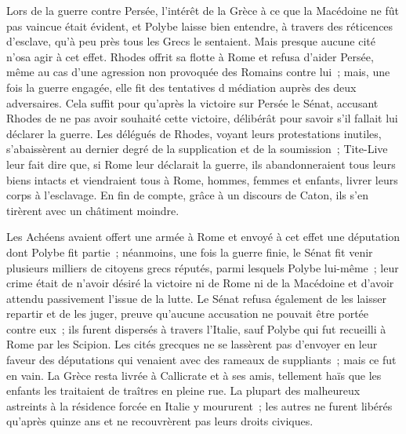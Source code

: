 \documentclass[french,twoside]{book} %
\begin{document}
Lors de la guerre contre Persée, l'intérêt de la Grèce à ce que la Macédoine ne fût pas vaincue était évident, et Polybe laisse bien entendre, à travers des réticences d'esclave, qu'à peu près tous les Grecs le sentaient. Mais presque aucune cité n'osa agir à cet effet. Rhodes offrit sa flotte à Rome et refusa d'aider Persée, même au cas d'une agression non provoquée des Romains contre lui ; mais, une fois la guerre engagée, elle fit des tentatives d médiation auprès des deux adversaires. Cela suffit pour qu'après la victoire sur Persée le Sénat, accusant Rhodes de ne pas avoir souhaité cette victoire, délibérât pour savoir s'il fallait lui déclarer la guerre. Les délégués de Rhodes, voyant leurs protestations inutiles, s'abaissèrent au dernier degré de la supplication et de la soumission ; Tite-Live leur fait dire que, si Rome leur déclarait la guerre, ils abandonneraient tous leurs biens intacts et viendraient tous à Rome, hommes, femmes et enfants, livrer leurs corps à l'esclavage. En fin de compte, grâce à un discours de Caton, ils s'en tirèrent avec un châtiment moindre.\par
Les Achéens avaient offert une armée à Rome et envoyé à cet effet une députation dont Polybe fit partie ; néanmoins, une fois la guerre finie, le Sénat fit venir plusieurs milliers de citoyens grecs réputés, parmi lesquels Polybe lui-même ; leur crime était de n'avoir désiré la victoire ni de Rome ni de la Macédoine et d'avoir attendu passivement l'issue de la lutte. Le Sénat refusa également de les laisser repartir et de les juger, preuve qu'aucune accusation ne pouvait être portée contre eux ; ils furent dispersés à travers l'Italie, sauf Polybe qui fut recueilli à Rome par les Scipion. Les cités grecques ne se lassèrent pas d'envoyer en leur faveur des députations qui venaient avec des rameaux de suppliants ; mais ce fut en vain. La Grèce resta livrée à Callicrate et à ses amis, tellement haïs que les enfants les traitaient de traîtres en pleine rue. La plupart des malheureux astreints à la résidence forcée en Italie y moururent ; les autres ne furent libérés qu'après quinze ans et ne recouvrèrent pas leurs droits civiques.\par
\end{document}
